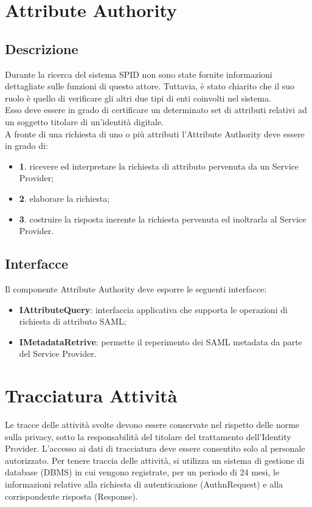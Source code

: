 \section{Attribute Authority}
\subsection{Descrizione}
Durante la ricerca del sistema SPID non sono state fornite informazioni dettagliate sulle funzioni di questo attore. Tuttavia, è stato chiarito che il suo ruolo è quello di 
verificare gli altri due tipi di enti coinvolti nel sistema.
\\ Esso deve essere in grado di certificare un determinato set di attributi relativi ad un soggetto titolare di
un'identità digitale. 
\\ A fronte di una richiesta di uno o più attributi l’Attribute Authority deve essere
in grado di:
\begin{itemize}
    \item \textbf{1}. ricevere ed interpretare la richiesta di attributo pervenuta da un Service Provider;
    \item \textbf{2}. elaborare la richiesta;
    \item \textbf{3}. costruire la risposta inerente la richiesta pervenuta ed inoltrarla al Service Provider.
\end{itemize}

\subsection{Interfacce}
Il componente Attribute Authority deve esporre le seguenti interfacce:
\begin{itemize}
    \item \textbf{IAttributeQuery}: interfaccia applicativa che supporta le operazioni di richiesta di attributo SAML;
    \item \textbf{IMetadataRetrive}: permette il reperimento dei SAML metadata da parte del Service Provider.
\end{itemize}

\section{Tracciatura Attività}
Le tracce delle attività svolte devono essere conservate nel rispetto delle norme sulla privacy, sotto la responsabilità del 
titolare del trattamento dell'Identity Provider. L'accesso ai dati di tracciatura deve essere consentito solo al personale 
autorizzato. Per tenere traccia delle attività, si utilizza un sistema di gestione di database (DBMS) in cui vengono registrate, 
per un periodo di 24 mesi, le informazioni relative alla richiesta di autenticazione (AuthnRequest) e alla corrispondente risposta 
(Response).

